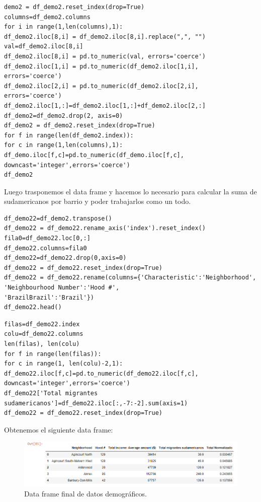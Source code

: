 \documentclass[10pt,a4paper,arial, spanish]{article}
\begin{document}
\begin{verbatim}
demo2 = df_demo2.reset_index(drop=True)
columns=df_demo2.columns
for i in range(1,len(columns),1):
df_demo2.iloc[8,i] = df_demo2.iloc[8,i].replace(",", "")
val=df_demo2.iloc[8,i]
df_demo2.iloc[8,i] = pd.to_numeric(val, errors='coerce')
df_demo2.iloc[1,i] = pd.to_numeric(df_demo2.iloc[1,i], errors='coerce')
df_demo2.iloc[2,i] = pd.to_numeric(df_demo2.iloc[2,i], errors='coerce')
df_demo2.iloc[1,:]=df_demo2.iloc[1,:]+df_demo2.iloc[2,:]
df_demo2=df_demo2.drop(2, axis=0)
df_demo2 = df_demo2.reset_index(drop=True)
for f in range(len(df_demo2.index)):
for c in range(1,len(columns),1):
df_demo.iloc[f,c]=pd.to_numeric(df_demo.iloc[f,c], downcast='integer',errors='coerce')
df_demo2  
\end{verbatim}
Luego trasponemos el data frame y hacemos lo necesario para calcular la suma de sudamericanos por barrio y poder trabajarlos como un todo.
\begin{verbatim}
df_demo22=df_demo2.transpose()
df_demo22 = df_demo22.rename_axis('index').reset_index()
fila0=df_demo22.loc[0,:]
df_demo22.columns=fila0
df_demo22=df_demo22.drop(0,axis=0)
df_demo22 = df_demo22.reset_index(drop=True)
df_demo22 = df_demo22.rename(columns={'Characteristic':'Neighborhood',
'Neighbourhood Number':'Hood #',
'BrazilBrazil':'Brazil'})
df_demo22.head()
\end{verbatim}
\begin{verbatim}
filas=df_demo22.index
colu=df_demo22.columns
len(filas), len(colu)
for f in range(len(filas)):
for c in range(1, len(colu)-2,1):
df_demo22.iloc[f,c]=pd.to_numeric(df_demo22.iloc[f,c], downcast='integer',errors='coerce')
df_demo22['Total migrantes sudamericanos']=df_demo22.iloc[:,-7:-2].sum(axis=1)
df_demo22 = df_demo22.reset_index(drop=True)
\end{verbatim}
Obtenemos el siguiente data frame:
\begin{figure}[h]
	\centering
	\includegraphics[scale=0.5]{df4}
	\caption[Data frame final de datos demográficos.]{Data frame final de datos demográficos.}
	\label{fig:df4}
\end{figure}
\end{document}
